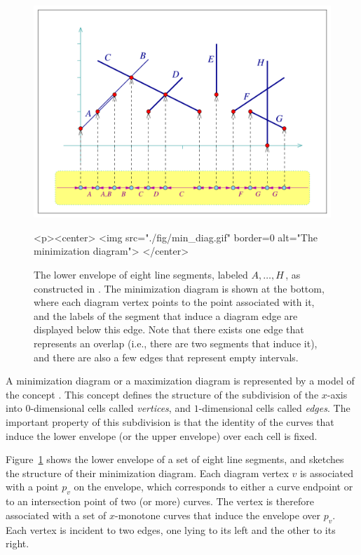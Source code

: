 \begin{figure}[t]
\begin{ccTexOnly}
  \begin{center}
    \includegraphics[width=5in]{Envelope_2/fig/min_diag}
  \end{center}
\end{ccTexOnly}
\begin{ccHtmlOnly}
  <p><center>
  <img src="./fig/min_diag.gif" border=0 alt="The minimization diagram">
  </center>
\end{ccHtmlOnly}
\caption{The lower envelope of eight line segments, labeled
$A, \ldots, H$\,, as constructed in .
The minimization diagram is shown at the bottom, where
each diagram vertex points to the point associated with it, and the
labels of the segment that induce a diagram edge are displayed below
this edge. Note that there exists one edge that represents an overlap
(i.e., there are two segments that induce it), and there are also a 
few edges that represent empty intervals.\label{env2_fig:min_diag}}
\end{figure}

A minimization diagram or a maximization diagram is represented by
a model of the concept . This concept defines
the structure of the subdivision of the $x$-axis into $0$-dimensional
cells called {\em vertices}, and $1$-dimensional cells called {\em edges}.
The important property of this subdivision is that the identity of
the curves that induce the lower envelope (or the upper envelope)
over each cell is fixed.

Figure~\ref{env2_fig:min_diag} shows the lower envelope of a set of
eight line segments, and sketches the structure of their minimization
diagram. Each diagram vertex $v$ is associated with a point $p_v$ on
the envelope, which corresponds to either a curve endpoint
or to an intersection point of two (or more) curves. The vertex is
therefore associated with a set of $x$-monotone curves that induce the
envelope over $p_v$. Each vertex is incident to two edges, one lying
to its left and the other to its right.


